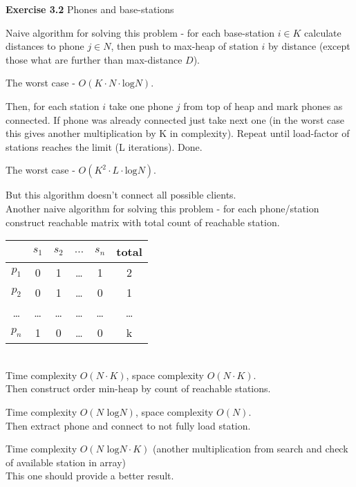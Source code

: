 \documentclass{article}
\begin{document}
\textbf{Exercise 3.2} Phones and base-stations

Naive algorithm for solving this problem - for each base-station $i \in K$ calculate
distances to phone $j \in N$, then push to max-heap of station $i$ by
distance (except those what are further than max-distance $D$).

The worst case - $O(K \cdot N \cdot \text{log} N)$.

Then, for each station $i$ take one phone $j$ from top of heap and mark phones as
connected. If phone was already connected just take next one (in the worst case
this gives another multiplication by K in complexity). Repeat until load-factor of
stations reaches the limit (L iterations). Done.

The worst case - $O(K^2 \cdot L \cdot \text{log} N)$.

But this algorithm doesn't connect all possible clients.\\

Another naive algorithm for solving this problem - for each phone/station construct
reachable matrix with total count of reachable station.\\

\begin{tabular}{|c|c|c|c|c|c|}
  \hline
        & $s_1$ & $s_2$ & $\dots$ & $s_n$ & total\\
  \hline
  $p_1$ & 0 & 1 & \dots & 1 & 2\\
  $p_2$ & 0 & 1 & \dots & 0 & 1\\
  \dots & \dots & \dots & \dots & \dots & \dots\\
  $p_n$ & 1 & 0 & \dots & 0 & k\\
  \hline
\end{tabular}\\

Time complexity $O(N \cdot K)$, space complexity $O(N \cdot K)$.\\

Then construct order min-heap by count of reachable stations.

Time complexity $O(N \text{ log}N)$, space complexity $O(N)$.\\

Then extract phone and connect to not fully load station.

Time complexity $O(N \text{ log}N \cdot K)$ (another multiplication from search
and check of available station in array)\\

This one should provide a better result.\\


\end{document}
